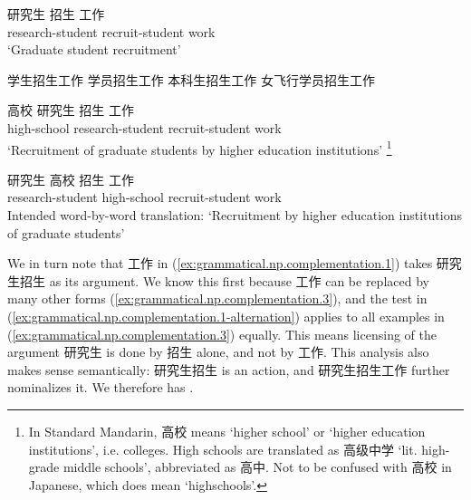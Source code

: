 \documentclass[UTF8, a4paper, oneside, scheme=plain, 12pt]{ctexrep}
\newcommand{\translate}[1]{`#1'}
\begin{document}
\begin{exe}
    \ex\label{ex:grammatical.np.complementation.1}
    \gll 研究生 招生 工作 \\
    research-student recruit-student work \\
    \glt\translate{Graduate student recruitment} 

    \ex\label{ex:grammatical.np.complementation.1.2}\begin{xlist}
        \ex 学生招生工作
        \ex 学员招生工作
        \ex 本科生招生工作
        \ex 女飞行学员招生工作
    \end{xlist}
    
    \ex\label{ex:grammatical.np.complementation.1-alternation} \begin{xlist}
        \ex \label{ex:grammatical.np.complementation.1-alternation.1}
        \gll 高校 研究生 招生 工作 \\
        high-school research-student recruit-student work \\
        \glt\translate{Recruitment of graduate students by higher education institutions}%
        \footnote{
            In Standard Mandarin, 高校 means \translate{higher school} 
            or \translate{higher education institutions}, i.e. colleges.
            High schools are translated as 高级中学 \translate{lit. high-grade middle schools},
            abbreviated as 高中.
            Not to be confused with 高校 in Japanese,
            which does mean \translate{highschools}.
        }

        \ex \label{ex:grammatical.np.complementation.1-alternation.2}
        \gll *研究生 高校 招生 工作 \\
        research-student high-school recruit-student work \\
        \glt Intended word-by-word translation: \translate{Recruitment by higher education institutions of graduate students}
    \end{xlist}
\end{exe}

We in turn note that 工作 in (\ref{ex:grammatical.np.complementation.1}) takes 研究生招生 as its argument.
We know this first because 工作 can be replaced by many other forms 
(\ref{ex:grammatical.np.complementation.3}),
and the test in (\ref{ex:grammatical.np.complementation.1-alternation})
applies to all examples in (\ref{ex:grammatical.np.complementation.3}) equally.
This means licensing of the argument 研究生 is done by 招生 alone,
and not by 工作.
This analysis also makes sense semantically:
研究生招生 is an action, and 研究生招生工作 further nominalizes it.
We therefore has .
\end{document}
